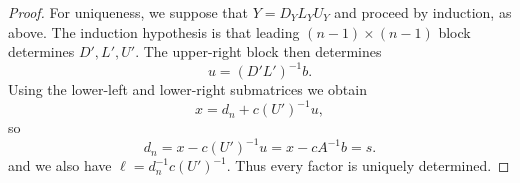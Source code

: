 \documentclass[10pt,a4paper]{amsart}
\begin{document}
\begin{proof}
\noindent For uniqueness, we suppose that \(Y=D_YL_YU_Y\) and proceed by induction, as above.  The induction hypothesis is that leading
\((n-1)\times(n-1)\) block determines \(D',L',U'\).  The
upper-right block then determines
\[
 u=(D'L')^{-1}b.
\]
Using the lower-left and lower-right submatrices we obtain
\[
 x=d_n+c(U')^{-1}u,
\]
so
\[
 d_n=x-c(U')^{-1}u=x-cA^{-1}b=s.
\]
and we also have $\ell=d_n^{-1}c(U')^{-1}$. Thus every factor is uniquely determined.
\end{proof}
\end{document}
